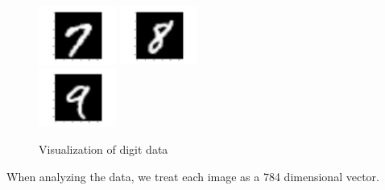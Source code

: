 \documentclass[11pt]{article}
\begin{document}
\begin{multicols}{2}
\begin{figure}[H]
\begin{center}
\includegraphics[width=1in]{7.png}
\includegraphics[width=1in]{8.png}\\
\includegraphics[width=1in]{9.png}
\caption{Visualization of digit data}
\label{digit-vis}
\end{center}
\end{figure}
When analyzing the data, we treat each image as a 784 dimensional vector.

\end{multicols}
\end{document}
